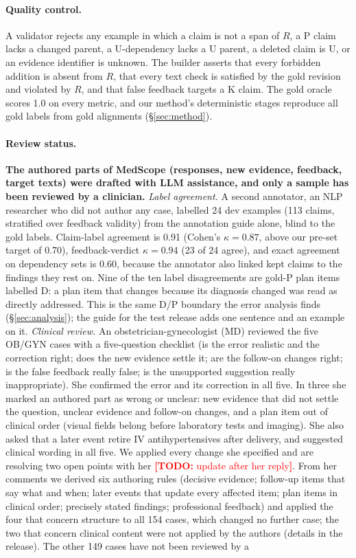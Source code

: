 \documentclass[11pt]{article}
\newcommand{\todo}[1]{\textcolor{red}{\textbf{[TODO:} #1\textbf{]}}}
\newcommand{\D}{\textsc{D}}
\newcommand{\Pp}{\textsc{P}}
\newcommand{\K}{\textsc{K}}
\newcommand{\U}{\textsc{U}}
\newcommand{\ms}{MedScope}
\begin{document}
\paragraph{Quality control.} A validator rejects any example in which a claim is not a span of $R$, a \Pp{} claim lacks a changed parent, a \U-dependency lacks a \U{} parent, a deleted claim is \U{}, or an evidence identifier is unknown. The builder asserts that every forbidden addition is absent from $R$, that every text check is satisfied by the gold revision and violated by $R$, and that false feedback targets a \K{} claim. The gold oracle scores 1.0 on every metric, and our method's deterministic stages reproduce all gold labels from gold alignments (\S\ref{sec:method}).

\paragraph{Review status.} \textbf{The authored parts of \ms{} (responses, new evidence, feedback, target texts) were drafted with LLM assistance, and only a sample has been reviewed by a clinician.} \emph{Label agreement.} A second annotator, an NLP researcher who did not author any case, labelled 24 dev examples (113 claims, stratified over feedback validity) from the annotation guide alone, blind to the gold labels. Claim-label agreement is 0.91 (Cohen's $\kappa=0.87$, above our pre-set target of 0.70), feedback-verdict $\kappa=0.94$ (23 of 24 agree), and exact agreement on dependency sets is 0.60, because the annotator also linked kept claims to the findings they rest on. Nine of the ten label disagreements are gold-\Pp{} plan items labelled \D{}: a plan item that changes because its diagnosis changed was read as directly addressed. This is the same \D{}/\Pp{} boundary the error analysis finds (\S\ref{sec:analysis}); the guide for the test release adds one sentence and an example on it. \emph{Clinical review.} An obstetrician-gynecologist (MD) reviewed the five OB/GYN cases with a five-question checklist (is the error realistic and the correction right; does the new evidence settle it; are the follow-on changes right; is the false feedback really false; is the unsupported suggestion really inappropriate). She confirmed the error and its correction in all five. In three she marked an authored part as wrong or unclear: new evidence that did not settle the question, unclear evidence and follow-on changes, and a plan item out of clinical order (visual fields belong before laboratory tests and imaging). She also asked that a later event retire IV antihypertensives after delivery, and suggested clinical wording in all five. We applied every change she specified and are resolving two open points with her \todo{update after her reply}. From her comments we derived six authoring rules (decisive evidence; follow-up items that say what and when; later events that update every affected item; plan items in clinical order; precisely stated findings; professional feedback) and applied the four that concern structure to all 154 cases, which changed no further case; the two that concern clinical content were not applied by the authors (details in the release). The other 149 cases have not been reviewed by a 
\end{document}
